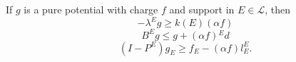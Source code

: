 If $g$ is a pure potential with charge $f$ and support in $E \in \mathcal{L}$, then
$$-\lambda^E g \geq k(E)(\alpha f)$$
$$B^E g \leq g + (\alpha f){}^E d$$
$$(I - P^E)g_E \geq f_E - (\alpha f)l_E^E.$$
